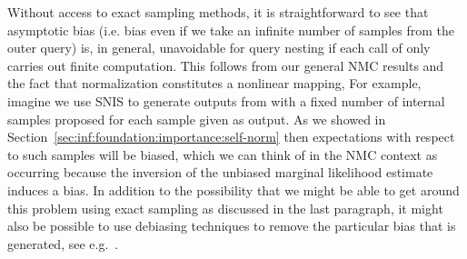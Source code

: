 

Without access to exact sampling methods, it is straightforward to see 
that asymptotic bias (i.e. bias even if we take
an infinite number of samples from the outer query) is, in general, unavoidable for
query nesting if each call of \conditional only carries out finite computation.  
This follows from our general NMC results and
the fact that normalization constitutes a nonlinear mapping,
For example, imagine we
use SNIS to generate outputs from \conditional
with a fixed number of internal samples proposed for each sample given as output.  As we showed in 
Section~\ref{sec:inf:foundation:importance:self-norm} then expectations with respect to such samples will be
biased, which we can think of in the NMC context as occurring because the inversion of the unbiased marginal likelihood estimate
induces a bias.  In addition to the possibility that we might be able to get around this
problem using exact sampling as discussed in the last paragraph, it might also be possible to
use debiasing techniques to remove the particular bias that is generated, see e.g.~\cite{glynn2014exact,jacob2017smoothing}.

